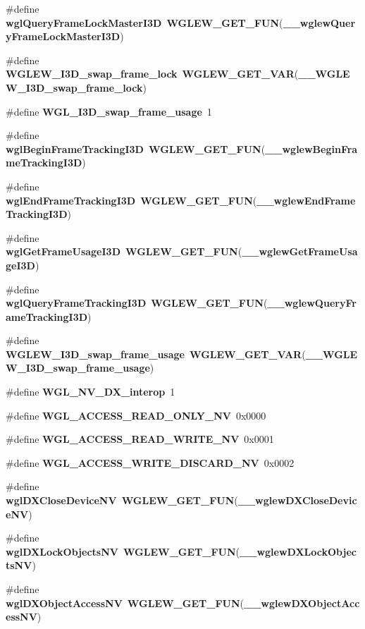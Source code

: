 \begin{DoxyCompactItemize}
\item 
\#define {\bf wgl\+Query\+Frame\+Lock\+Master\+I3D}~{\bf W\+G\+L\+E\+W\+\_\+\+G\+E\+T\+\_\+\+F\+UN}({\bf \+\_\+\+\_\+wglew\+Query\+Frame\+Lock\+Master\+I3D})
\item 
\#define {\bf W\+G\+L\+E\+W\+\_\+\+I3\+D\+\_\+swap\+\_\+frame\+\_\+lock}~{\bf W\+G\+L\+E\+W\+\_\+\+G\+E\+T\+\_\+\+V\+AR}({\bf \+\_\+\+\_\+\+W\+G\+L\+E\+W\+\_\+\+I3\+D\+\_\+swap\+\_\+frame\+\_\+lock})
\item 
\#define {\bf W\+G\+L\+\_\+\+I3\+D\+\_\+swap\+\_\+frame\+\_\+usage}~1
\item 
\#define {\bf wgl\+Begin\+Frame\+Tracking\+I3D}~{\bf W\+G\+L\+E\+W\+\_\+\+G\+E\+T\+\_\+\+F\+UN}({\bf \+\_\+\+\_\+wglew\+Begin\+Frame\+Tracking\+I3D})
\item 
\#define {\bf wgl\+End\+Frame\+Tracking\+I3D}~{\bf W\+G\+L\+E\+W\+\_\+\+G\+E\+T\+\_\+\+F\+UN}({\bf \+\_\+\+\_\+wglew\+End\+Frame\+Tracking\+I3D})
\item 
\#define {\bf wgl\+Get\+Frame\+Usage\+I3D}~{\bf W\+G\+L\+E\+W\+\_\+\+G\+E\+T\+\_\+\+F\+UN}({\bf \+\_\+\+\_\+wglew\+Get\+Frame\+Usage\+I3D})
\item 
\#define {\bf wgl\+Query\+Frame\+Tracking\+I3D}~{\bf W\+G\+L\+E\+W\+\_\+\+G\+E\+T\+\_\+\+F\+UN}({\bf \+\_\+\+\_\+wglew\+Query\+Frame\+Tracking\+I3D})
\item 
\#define {\bf W\+G\+L\+E\+W\+\_\+\+I3\+D\+\_\+swap\+\_\+frame\+\_\+usage}~{\bf W\+G\+L\+E\+W\+\_\+\+G\+E\+T\+\_\+\+V\+AR}({\bf \+\_\+\+\_\+\+W\+G\+L\+E\+W\+\_\+\+I3\+D\+\_\+swap\+\_\+frame\+\_\+usage})
\item 
\#define {\bf W\+G\+L\+\_\+\+N\+V\+\_\+\+D\+X\+\_\+interop}~1
\item 
\#define {\bf W\+G\+L\+\_\+\+A\+C\+C\+E\+S\+S\+\_\+\+R\+E\+A\+D\+\_\+\+O\+N\+L\+Y\+\_\+\+NV}~0x0000
\item 
\#define {\bf W\+G\+L\+\_\+\+A\+C\+C\+E\+S\+S\+\_\+\+R\+E\+A\+D\+\_\+\+W\+R\+I\+T\+E\+\_\+\+NV}~0x0001
\item 
\#define {\bf W\+G\+L\+\_\+\+A\+C\+C\+E\+S\+S\+\_\+\+W\+R\+I\+T\+E\+\_\+\+D\+I\+S\+C\+A\+R\+D\+\_\+\+NV}~0x0002
\item 
\#define {\bf wgl\+D\+X\+Close\+Device\+NV}~{\bf W\+G\+L\+E\+W\+\_\+\+G\+E\+T\+\_\+\+F\+UN}({\bf \+\_\+\+\_\+wglew\+D\+X\+Close\+Device\+NV})
\item 
\#define {\bf wgl\+D\+X\+Lock\+Objects\+NV}~{\bf W\+G\+L\+E\+W\+\_\+\+G\+E\+T\+\_\+\+F\+UN}({\bf \+\_\+\+\_\+wglew\+D\+X\+Lock\+Objects\+NV})
\item 
\#define {\bf wgl\+D\+X\+Object\+Access\+NV}~{\bf W\+G\+L\+E\+W\+\_\+\+G\+E\+T\+\_\+\+F\+UN}({\bf \+\_\+\+\_\+wglew\+D\+X\+Object\+Access\+NV})

\end{DoxyCompactItemize}

